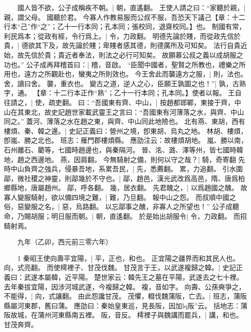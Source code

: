 　　國人皆不欲，公子成稱疾不朝。|{
	朝，直遙翻。
}
王使人請之曰：“家聽於親，|{
	親，謂父母。
}
國聽於君。
	今寡人作教易服而公叔不服，吾恐天下議己【章：十二行本“己”作“之”；乙十一行本同；孔本同；張校同，退齋校同。】也。
	制國有常，利民爲本；從政有經，令行爲上。|{
	令，力政翻。
}
明德先論於賤，而從政先信於貴，|{
	德欲其下及，故先論於賤；卑賤者感其德，則德廣所及可知矣。
	法行自貴近始，故先信於貴；貴近者奉法，則法之必行可知矣。
}
故願慕公叔之義以成胡服之功也。”
公子成再拜稽首曰：|{
	稽，音啟。
}
“臣聞中國者，聖賢之所教也，禮樂之所用也，遠方之所觀赴也，蠻夷之所則效也。
	今王舍此而襲遠方之服，|{
	則，法也。
	舍，讀曰舍。
	襲，重衣也。
}
變古之道，逆人之心，臣願王孰圖之也！”|{
	孰，古熟字，通。
}
【章：十二行本正作“熟”；乙十一行本同；孔本同。】使者以報。
	王自往請之，|{
	使，疏吏翻。
}
曰：“吾國東有齊、中山，|{
	按趙都邯鄲，東接于齊，中山在其東北，故史記趙世家載武靈王之言曰：“吾國東有河薄落之水，與齊、中山同之。”
	蓋河、薄落之水在趙之東，與齊、中山同此地險也。
}
北有燕、東胡，西有樓煩、秦、韓之邊。|{
	史記正義曰：營州之境，卽東胡、烏丸之地。
	林胡、樓煩，卽嵐、勝之北也。
	班志：雁門郡樓煩縣。
	應劭注云：故樓煩胡地。
	嵐、勝以南，石州離石、藺等，七國時趙邊也，與秦隔河。
	晉、洺、潞、澤等州，皆七國時韓地，趙之西邊地。
	燕，因肩翻。
}
今無騎射之備，則何以守之哉？|{
	騎，奇寄翻
	}
先時中山負齊之強兵，侵暴吾地，系累吾民，|{
	先，悉薦翻。
	累，力追翻。
}
引水圍鄗，微社稷之神靈，則鄗幾於不守也。|{
	鄗，趙邑，漢光武改爲高邑，隋、唐爲柏鄉縣地，唐屬趙州。
	鄗，呼各翻。
	幾，居衣翻。
}
先君醜之，|{
	以爲趙國之醜。
}
故寡人變服騎射，欲以備四境之難，|{
	難，乃旦翻。
}
報中山之怨。
	而叔順中國之俗，惡變服之名，|{
	惡，烏路翻。
}
以忘鄗事之醜，非寡人之所望也！”
公子成聽命，乃賜胡服；明日服而朝。|{
	朝，直遙翻。
}
於是始出胡服令|{
	令，力政翻。
}
而招騎射焉。


　　九年（乙卯，西元前三零六年）

　　1 秦昭王使向壽平宜陽，|{
	平，正也，和也。
	正宜陽之疆界而和其民人也。
	向，式亮翻。
}
而使樗裡子、甘茂伐魏。
	甘茂言于王，以武遂複歸之韓。|{
	史記正義曰：武遂本屬韓，近平陽。
	楚世家云：韓先王之墓在平陽，武遂去之七十裡。
	去年秦拔宜陽，因涉河城武遂，今複歸之韓。
	複，音如字。
}
向壽、公孫奭爭之，不能得，|{
	向，式讓翻。
}
由此怨讒甘茂。
	茂懼，輟伐魏蒲阪，亡去。|{
	班志，蒲阪縣屬河東郡，舊曰蒲。
	應劭曰：秦始皇東巡，見長阪，因加lq阪”云。
	括地志：蒲阪故城，在蒲州河東縣南五裡。
	阪，音反。
}
樗裡子與魏講而罷兵，|{
	講，和也。
}
甘茂奔齊。


